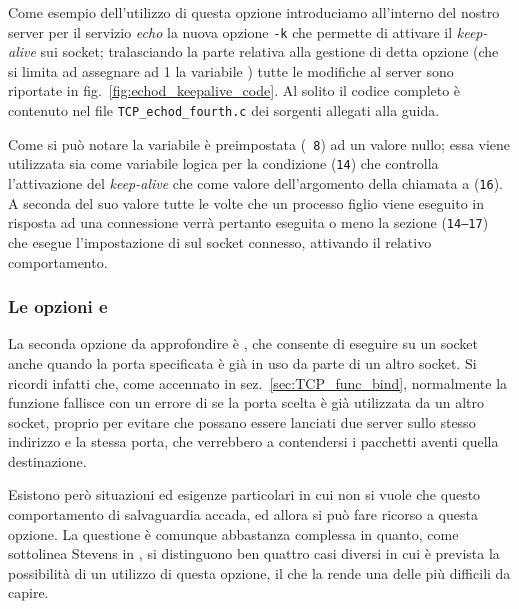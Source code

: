 Come esempio dell'utilizzo di questa opzione introduciamo all'interno del
nostro server per il servizio \textit{echo} la nuova opzione \texttt{-k} che
permette di attivare il \textit{keep-alive} sui socket; tralasciando la parte
relativa alla gestione di detta opzione (che si limita ad assegnare ad 1 la
variabile ) tutte le modifiche al server sono riportate in
fig.~\ref{fig:echod_keepalive_code}. Al solito il codice completo è contenuto
nel file \texttt{TCP\_echod\_fourth.c} dei sorgenti allegati alla guida.

Come si può notare la variabile  è preimpostata (\texttt{\small
  8}) ad un valore nullo; essa viene utilizzata sia come variabile logica per
la condizione (\texttt{\small 14}) che controlla l'attivazione del
\textit{keep-alive} che come valore dell'argomento  della
chiamata a  (\texttt{\small 16}).  A seconda del suo valore
tutte le volte che un processo figlio viene eseguito in risposta ad una
connessione verrà pertanto eseguita o meno la sezione (\texttt{\small 14--17})
che esegue l'impostazione di  sul socket connesso,
attivando il relativo comportamento.



\subsubsection{Le opzioni  e }

La seconda opzione da approfondire è , che consente di
eseguire  su un socket anche quando la porta specificata è già in
uso da parte di un altro socket. Si ricordi infatti che, come accennato in
sez.~\ref{sec:TCP_func_bind}, normalmente la funzione  fallisce con
un errore di  se la porta scelta è già utilizzata da un
altro socket, proprio per evitare che possano essere lanciati due server sullo
stesso indirizzo e la stessa porta, che verrebbero a contendersi i pacchetti
aventi quella destinazione.

Esistono però situazioni ed esigenze particolari in cui non si vuole che
questo comportamento di salvaguardia accada, ed allora si può fare ricorso a
questa opzione.  La questione è comunque abbastanza complessa in quanto, come
sottolinea Stevens in \cite{UNP1}, si distinguono ben quattro casi diversi in
cui è prevista la possibilità di un utilizzo di questa opzione, il che la
rende una delle più difficili da capire.

